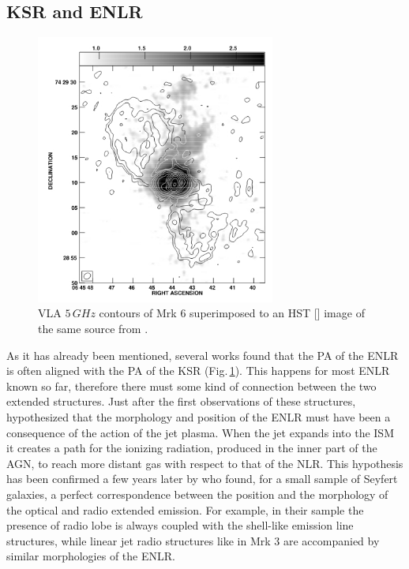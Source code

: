 \documentclass[../thesis.tex]{subfiles}
\begin{document}
\subsection{KSR and ENLR}

\begin{figure}
\centering
\includegraphics[width=0.7\textwidth]{images/Mrk6_kharb.jpg} 
\caption[]{VLA $5\,\si{GHz}$ contours of Mrk 6 superimposed to an HST [] image of the same source from \citet{Kharb06}. }
\label{fig:mrk6_kharb}
\end{figure}

As it has already been mentioned, several works found that the PA of the ENLR is often aligned with the PA of the KSR \citep[e.g.][]{Unger87,Wilson94,Capetti96,Falcke98,Schmitt03,Schmitt03b,Morganti07,Husemann13} (Fig.\,\ref{fig:mrk6_kharb}). 
This happens for most ENLR known so far, therefore there must some kind of connection between the two extended structures.
Just after the first observations of these structures, \citet{Wilson94} hypothesized that the morphology and position of the ENLR must have been a consequence of the action of the jet plasma.
When the jet expands into the ISM it creates a path for the ionizing radiation, produced in the inner part of the AGN, to reach more distant gas with respect to that of the NLR.
This hypothesis has been confirmed a few years later by \citet{Capetti96} who found, for a small sample of Seyfert galaxies, a perfect correspondence between the position and the morphology of the optical and radio extended emission.
For example, in their sample the presence of radio lobe is always coupled with the shell-like emission line structures, while linear jet radio structures like in Mrk 3 are accompanied by similar morphologies of the ENLR.
\end{document}
